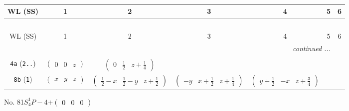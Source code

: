\documentclass[fleqn,9pt,landscape]{jsarticle}
\begin{document}
\begin{center}
\renewcommand{\arraystretch}{1.2}
\begin{longtable}{ccccccc}
 \hline \hline
WL (SS) & 1 & 2 & 3 & 4 & 5 & 6 \\ \hline \endfirsthead

\multicolumn{6}{l}{\tablename\ \thetable{}} \\
 \hline \hline
WL (SS) & 1 & 2 & 3 & 4 & 5 & 6 \\ \hline \endhead

 \hline \hline
\multicolumn{6}{r}{\footnotesize\it continued ...} \\ \endfoot

 \hline \hline
\multicolumn{6}{r}{} \\ \endlastfoot

{\tt 4a} ({\tt 2..}) & $ \begin{pmatrix} 0 & 0 & z \end{pmatrix} $ & $ \begin{pmatrix} 0 & \frac{1}{2} & z + \frac{1}{4} \end{pmatrix} $ & $  $ & $  $ \\ \hline
{\tt 8b} ({\tt 1}) & $ \begin{pmatrix} x & y & z \end{pmatrix} $ & $ \begin{pmatrix} \frac{1}{2} - x & \frac{1}{2} - y & z + \frac{1}{2} \end{pmatrix} $ & $ \begin{pmatrix} - y & x + \frac{1}{2} & z + \frac{1}{4} \end{pmatrix} $ & $ \begin{pmatrix} y + \frac{1}{2} & - x & z + \frac{3}{4} \end{pmatrix} $ \\
\end{longtable}
\end{center}
\newpage
No. 81\quad$S_{4}^{1}$\quad$P-4$\quad[ tetragonal ]\quad$+\begin{pmatrix} 0 & 0 & 0 \end{pmatrix}$
\end{document}
